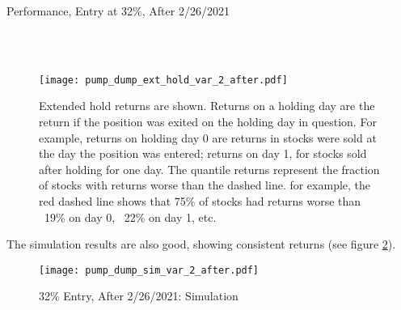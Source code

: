 \documentclass{article}
\begin{document}
\begin{table}
\caption{Performance, Entry at 32\%, After 2/26/2021}
\\[2ex]


\\[2ex]

\label{tab_var_2_after}
\end{table}

\begin{figure}
\texttt{[image: pump\_dump\_ext\_hold\_var\_2\_after.pdf]}
\caption{Extended hold returns are shown. Returns on a holding day are the return if the position was exited on the holding day in question. For example, returns on holding day 0 are returns in stocks were sold at the day the position was entered; returns on day 1, for stocks sold after holding for one day. The quantile returns represent the fraction of stocks with returns worse than the dashed line. for example, the red dashed line shows that 75\% of stocks had returns worse than ~19\% on day 0, ~22\% on day 1, etc.}
\label{fig_var_2_ext_hold_after}
\end{figure}

The simulation results are also good, showing consistent returns (see figure \ref{fig_var_2_sim_after}).

\begin{figure}
\caption{32\% Entry, After 2/26/2021: Simulation}
\center
\texttt{[image: pump\_dump\_sim\_var\_2\_after.pdf]}
\label{fig_var_2_sim_after}
\end{figure}
\end{document}

